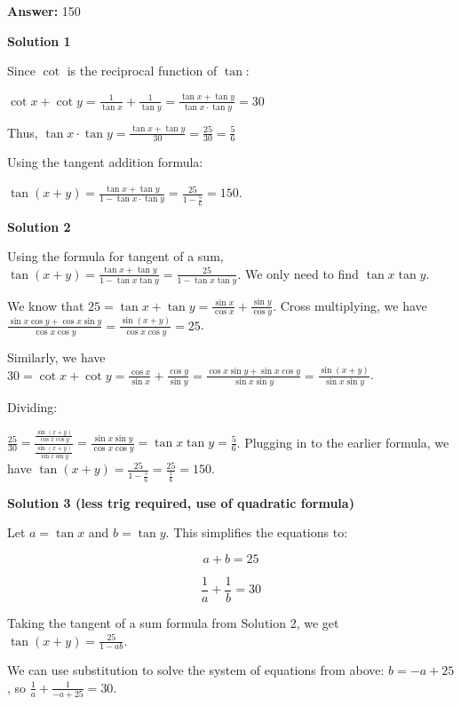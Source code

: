 \begin{enumerate}
 
 \textbf{Answer: }150



\textbf{Solution 1}

Since $\cot$ is the reciprocal function of $\tan$:

 $\cot x + \cot y = \frac{1}{\tan x} + \frac{1}{\tan y} = \frac{\tan x + \tan y}{\tan x \cdot \tan y} = 30$

 Thus, $\tan x \cdot \tan y = \frac{\tan x + \tan y}{30} = \frac{25}{30} = \frac{5}{6}$

 Using the tangent addition formula: 

 $\tan(x+y) = \frac{\tan x + \tan y}{1-\tan x \cdot \tan y} = \frac{25}{1-\frac{5}{6}} = \boxed{150}$.

 



\textbf{Solution 2}

Using the formula for tangent of a sum, $\tan(x+y)=\frac{\tan x + \tan y}{1-\tan x \tan y} = \frac{25}{1-\tan x \tan y}$. We only need to find $\tan x \tan y$.

 We know that $25 = \tan x + \tan y = \frac{\sin x}{\cos x} + \frac{\sin y}{\cos y}$. Cross multiplying, we have $\frac{\sin x \cos y + \cos x \sin y}{\cos x \cos y} = \frac{\sin(x+y)}{\cos x \cos y} = 25$.

 Similarly, we have $30 = \cot x + \cot y = \frac{\cos x}{\sin x} + \frac{\cos y}{\sin y} = \frac{\cos x \sin y + \sin x \cos y}{\sin x \sin y} = \frac{\sin(x+y)}{\sin x \sin y}$.

 Dividing:

 $\frac{25}{30} = \frac{\frac{\sin(x+y)}{\cos x \cos y}}{\frac{\sin(x+y)}{\sin x \sin y}} = \frac{\sin x \sin y}{\cos x \cos y} = \tan x \tan y = \frac{5}{6}$. Plugging in to the earlier formula, we have $\tan(x+y) = \frac{25}{1-\frac{5}{6}} = \frac{25}{\frac{1}{6}} = \boxed{150}$.

 



\textbf{Solution 3 (less trig required, use of quadratic formula)}

Let $a=\tan x$ and $b=\tan y$. This simplifies the equations to:

 
 \[a + b = 25\]

 \[\frac{1}{a} + \frac{1}{b} = 30\]

 Taking the tangent of a sum formula from Solution 2, we get $\tan(x+y) = \frac{25}{1 - ab}$. 

 We can use substitution to solve the system of equations from above: $b = -a + 25$, so $\frac{1}{a} + \frac{1}{-a + 25} = 30$. 


\end{enumerate}
